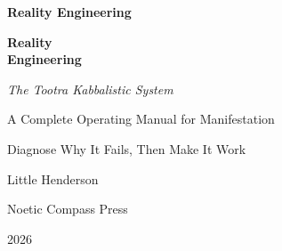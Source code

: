 
\frontmatter
\pagestyle{plainbook}

\thispagestyle{empty}
\begin{center}
  \vspace*{2.5in}
  {\huge\bfseries Reality Engineering\par}
\end{center}
\cleardoublepage

\thispagestyle{empty}
\begin{center}
  \vspace*{1.2in}
  {\Huge\bfseries Reality\\[0.12in] Engineering\par}
  \vspace{0.55in}
  {\Large\itshape The Tootra Kabbalistic System\par}
  \vspace{0.3in}
  {\large A Complete Operating Manual for Manifestation\par}
  \vspace{0.10in}
  {\large Diagnose Why It Fails, Then Make It Work\par}
  \vspace{1.15in}
  {\Large Little Henderson\par}
  \vfill
  {\normalsize Noetic Compass Press\par}
  {\small 2026\par}
\end{center}
\clearpage

